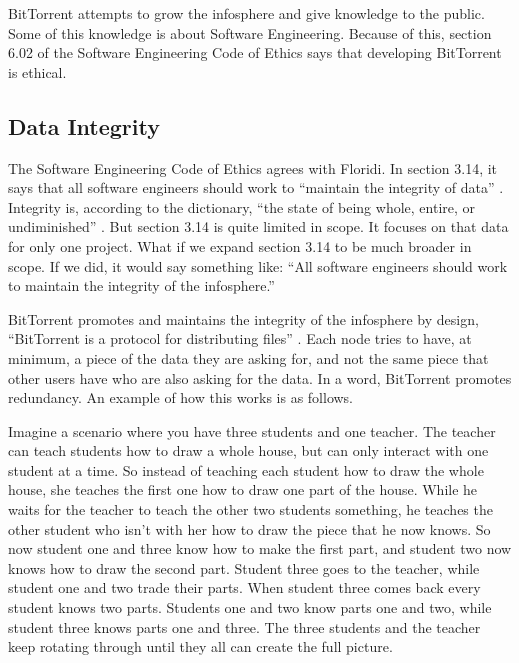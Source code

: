\documentclass[11pt]{article}
\begin{document}
\begin{multicols}{2}
BitTorrent attempts to grow the infosphere and give knowledge to the public. Some of this knowledge is about Software Engineering. Because of this, section 6.02 of the Software Engineering Code of Ethics says that developing BitTorrent is ethical.

\subsection{Data Integrity}

The Software Engineering Code of Ethics agrees with Floridi. In section 3.14, it says that all software engineers should work to ``maintain the integrity of data'' \cite[3.14]{secode}. Integrity is, according to the dictionary, ``the state of being whole, entire, or undiminished'' \cite{integrity}. But section 3.14 is quite limited in scope. It focuses on that data for only one project. What if we expand section 3.14 to be much broader in scope. If we did, it would say something like: ``All software engineers should work to maintain the integrity of the infosphere.''

BitTorrent promotes and maintains the integrity of the infosphere by design, ``BitTorrent is a protocol for distributing files'' \cite{btspec}. Each node tries to have, at minimum, a piece of the data they are asking for, and not the same piece that other users have who are also asking for the data. In a word, BitTorrent promotes redundancy. An example of how this works is as follows.

Imagine a scenario where you have three students and one teacher. The teacher can teach students how to draw a whole house, but can only interact with one student at a time. So instead of teaching each student how to draw the whole house, she teaches the first one how to draw one part of the house. While he waits for the teacher to teach the other two students something, he teaches the other student who isn't with her how to draw the piece that he now knows. So now student one and three know how to make the first part, and student two now knows how to draw the second part. Student three goes to the teacher, while student one and two trade their parts. When student three comes back every student knows two parts. Students one and two know parts one and two, while student three knows parts one and three. The three students and the teacher keep rotating through until they all can create the full picture.


\end{multicols}
\end{document}
